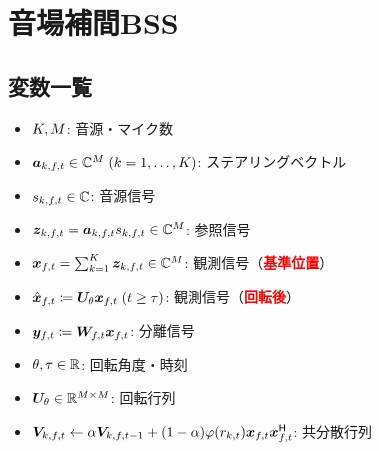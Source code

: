 \documentclass[twocolumn,9pt,dvipdfmx]{article}
\begin{document}
\clearpage\newpage



\clearpage\newpage
\section*{音場補間BSS}
\subsection*{変数一覧}
\begin{itemize}
  \item $K, M$: 音源・マイク数
  \item $\steer _{\src,\ft} \in \C ^{\Mic}\; (\src = 1, \dots, \Src)$: ステアリングベクトル
  \item $\sig _{\src,\ft} \in \C$: 音源信号
  \item $\Img _{\src,\ft} = \steer _{\src,\ft} \sig _{\src,\ft} \in \C^{\Mic}$: 参照信号%
  \item $\Obs _{\ft} = \sum _{\src=1} ^{\Src} \Img _{\src,\ft} \in \C^{\Mic}$: 観測信号（\textcolor{red}{\textbf{基準位置}}）
  \item $\rotObs _{\ft} \coloneqq \rotMat _{\rotDeg} \Obs _{\ft} \; (\tframe \geq \rotFra)$: 観測信号（\textcolor{red}{\textbf{回転後}}）
  \item $\Est _{\ft} \coloneqq \Demix _{\ft} \Obs _{\ft}$: 分離信号
  \item $\theta, \tau \in \mathbb{R}$: 回転角度・時刻
  \item $\bm{U} _{\theta} \in \mathbb{R} ^{M \times M}$: 回転行列
  \item $\cov _{\src,\ft} \gets \forget \cov _{\src,\ft[-1]} + (1 - \forget) \weight (\var _{\src,\tframe}) \Obs _{\ft} \Obs _{\ft} ^{\hermite}$: 共分散行列
\end{itemize}
\end{document}
